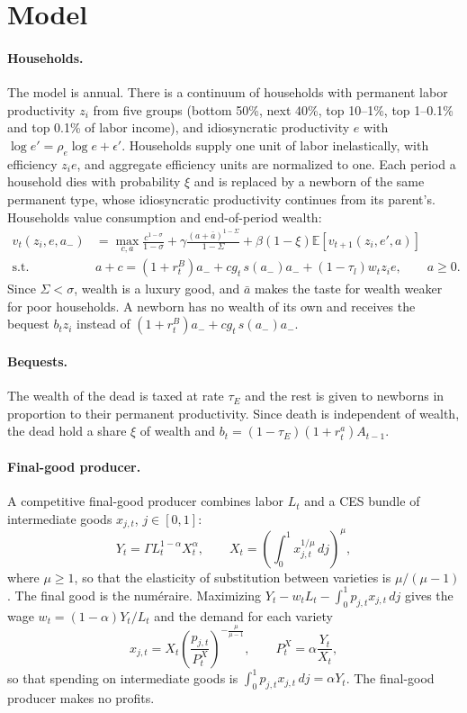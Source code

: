 \documentclass[12pt]{article}
\begin{document}
\section{Model}

\paragraph*{Households.}
The model is annual. There is a continuum of households with permanent labor productivity $z_i$ from five groups (bottom 50\%, next 40\%, top 10--1\%, top 1--0.1\% and top 0.1\% of labor income), and idiosyncratic productivity $e$ with $\log e'=\rho_e\log e+\epsilon'$.
Households supply one unit of labor inelastically, with efficiency $z_i e$, and aggregate efficiency units are normalized to one.
Each period a household dies with probability $\xi$ and is replaced by a newborn of the same permanent type, whose idiosyncratic productivity continues from its parent's.
Households value consumption and end-of-period wealth:
\begin{align*}
v_t(z_i,e,a_{-}) & =\max_{c,a}\frac{c^{1-\sigma}}{1-\sigma}+\gamma\frac{(a+\bar a)^{1-\Sigma}}{1-\Sigma}+\beta(1-\xi)\mathbb{E}\left[v_{t+1}(z_i,e',a)\right]\\
\text{s.t. } & a+c=(1+r^B_t)a_{-}+cg_t\,s(a_{-})a_{-}+(1-\tau_l)w_t z_i e,\qquad a\geq0.
\end{align*}
Since $\Sigma<\sigma$, wealth is a luxury good, and $\bar a$ makes the taste for wealth weaker for poor households.
A newborn has no wealth of its own and receives the bequest $b_t z_i$ instead of $(1+r^B_t)a_{-}+cg_t\,s(a_{-})a_{-}$.

\paragraph*{Bequests.}
The wealth of the dead is taxed at rate $\tau_E$ and the rest is given to newborns in proportion to their permanent productivity. Since death is independent of wealth, the dead hold a share $\xi$ of wealth and $b_t=(1-\tau_E)(1+r^a_t)A_{t-1}$.

\paragraph*{Final-good producer.}
A competitive final-good producer combines labor $L_t$ and a CES bundle of intermediate goods $x_{j,t}$, $j\in[0,1]$:
$$Y_t=\Gamma L_t^{1-\alpha}X_t^{\alpha},\qquad X_t=\left(\int_0^1 x_{j,t}^{1/\mu}\,dj\right)^{\mu},$$
where $\mu\geq1$, so that the elasticity of substitution between varieties is $\mu/(\mu-1)$. The final good is the numéraire.
Maximizing $Y_t-w_tL_t-\int_0^1 p_{j,t}x_{j,t}\,dj$ gives the wage $w_t=(1-\alpha)Y_t/L_t$ and the demand for each variety
$$x_{j,t}=X_t\left(\frac{p_{j,t}}{P^X_t}\right)^{-\frac{\mu}{\mu-1}},\qquad P^X_t=\alpha\frac{Y_t}{X_t},$$
so that spending on intermediate goods is $\int_0^1 p_{j,t}x_{j,t}\,dj=\alpha Y_t$. The final-good producer makes no profits.
\end{document}

